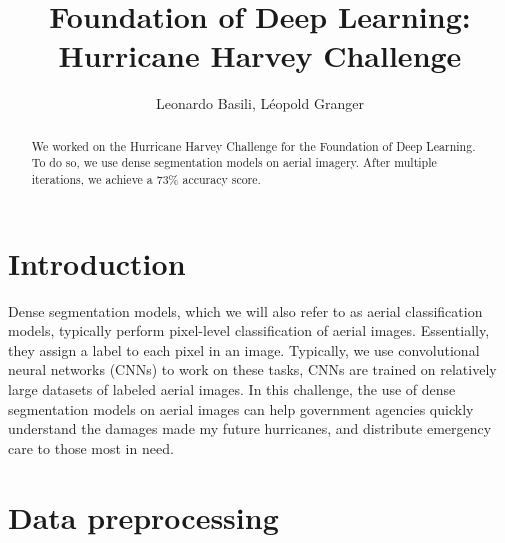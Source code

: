 \documentclass{article}
\title{Foundation of Deep Learning: Hurricane Harvey Challenge}
\author{Leonardo Basili, Léopold Granger}
\begin{document}
\maketitle

\begin{abstract}
We worked on the Hurricane Harvey Challenge for the Foundation of Deep Learning. To do so, we use dense segmentation models on aerial imagery. After multiple iterations, we achieve a 73\% accuracy score. 
\end{abstract}

\section{Introduction}

Dense segmentation models, which we will also refer to as aerial classification models, typically perform pixel-level classification of aerial images. Essentially, they assign a label to each pixel in an image. Typically, we use convolutional neural networks (CNNs) to work on these tasks, CNNs are trained on relatively large datasets of labeled aerial images. In this challenge, the use of dense segmentation models on aerial images can help government agencies quickly understand the damages made my future hurricanes, and distribute emergency care to those most in need.   

\section{Data preprocessing}
\end{document}
